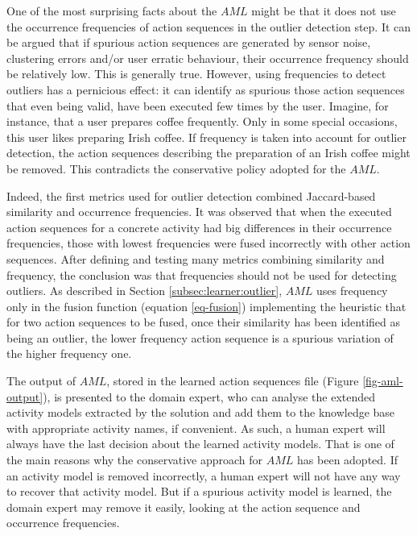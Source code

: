 One of the most surprising facts about the $AML$ might be that it does not use the occurrence frequencies of action sequences in the outlier detection step. It can be argued that if spurious action sequences are generated by sensor noise, clustering errors and/or user erratic behaviour, their occurrence frequency should be relatively low. This is generally true. However, using frequencies to detect outliers has a pernicious effect: it can identify as spurious those action sequences that even being valid, have been executed few times by the user. Imagine, for instance, that a user prepares coffee frequently. Only in some special occasions, this user likes preparing Irish coffee. If frequency is taken into account for outlier detection, the action sequences describing the preparation of an Irish coffee might be removed. This contradicts the conservative policy adopted for the $AML$.

Indeed, the first metrics used for outlier detection combined Jaccard-based similarity and occurrence frequencies. It was observed that when the executed action sequences for a concrete activity had big differences in their occurrence frequencies, those with lowest frequencies were fused incorrectly with other action sequences. After defining and testing many metrics combining similarity and frequency, the conclusion was that frequencies should not be used for detecting outliers. As described in Section \ref{subsec:learner:outlier}, $AML$ uses frequency only in the fusion function (equation \ref{eq-fusion}) implementing the heuristic that for two action sequences to be fused, once their similarity has been identified as being an outlier, the lower frequency action sequence is a spurious variation of the higher frequency one. 

The output of $AML$, stored in the learned action sequences file (Figure \ref{fig-aml-output}), is presented to the domain expert, who can analyse the extended activity models extracted by the solution and add them to the knowledge base with appropriate activity names, if convenient. As such, a human expert will always have the last decision about the learned activity models. That is one of the main reasons why the conservative approach for $AML$ has been adopted. If an activity model is removed incorrectly, a human expert will not have any way to recover that activity model. But if a spurious activity model is learned, the domain expert may remove it easily, looking at the action sequence and occurrence frequencies.